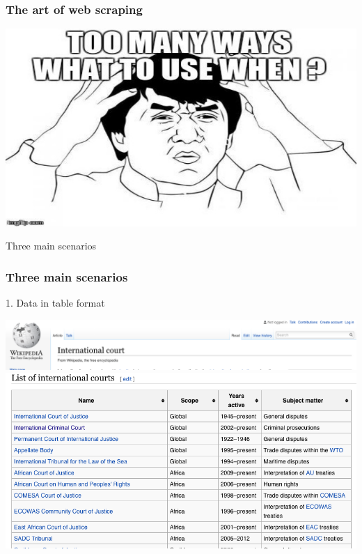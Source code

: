 \documentclass{beamer}
\begin{document}
\begin{frame}
	\frametitle{The art of web scraping}
	\centering
	\includegraphics[width=1\textwidth]{figures/whattouse.jpg}
	
	\Large{\alert{Three main scenarios}}
	
\end{frame}

\begin{frame}
	\frametitle{Three main scenarios}
	
	1. Data in table format \\
	\vspace{.25cm}
	
	
	\includegraphics[width=1\textwidth]{figures/wikitable1.png}\\
	\includegraphics[width=\textwidth]{figures/wikitable2.png}
	
\end{frame}
\end{document}
